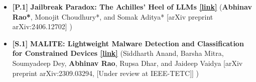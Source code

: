 \documentclass[11pt,letterpaper]{article}
\begin{document}
\begin{itemize}[leftmargin=*,label={},itemsep=4pt]
        \item {\color{maincolor}\textbf{[P.1]}} \textbf{Jailbreak Paradox: The Achilles' Heel of LLMs \href{https://arxiv.org/abs/2406.12702}{[link]}}  (\textbf{Abhinav Rao*}, Monojit Choudhury*, and Somak Aditya*
            [arXiv preprint arXiv:2406.12702]
        )
           
        \item {\color{maincolor}\textbf{[S.1]}} \textbf{MALITE: Lightweight Malware Detection and Classification
                for Constrained Devices \href{https://arxiv.org/abs/2309.03294}{[link]}}  (Siddharth Anand, Barsha Mitra, Soumyadeep Dey, \textbf{Abhinav Rao}, Rupsa Dhar, and Jaideep Vaidya
            [arXiv preprint arXiv:2309.03294, [Under review at IEEE-TETC]]
        )
           
    \end{itemize}
    
\end{document}
